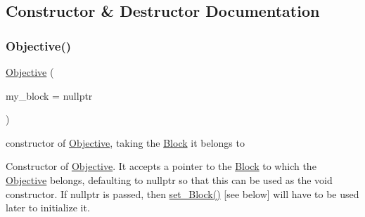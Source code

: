 \subsection{Constructor \& Destructor Documentation}
\mbox{\label{class_s_m_spp__di__unipi__it_1_1_objective_a27af263cb52b39bdee207cff5c4ba18e}} 
\subsubsection{\texorpdfstring{Objective()}{Objective()}\hspace{0.1cm}{\footnotesize\ttfamily [1/2]}}
{\footnotesize\ttfamily \mbox{\hyperlink{class_s_m_spp__di__unipi__it_1_1_objective}{Objective}} (\begin{DoxyParamCaption}\item[{\mbox{\hyperlink{class_s_m_spp__di__unipi__it_1_1_block}{Block}} $\ast$}]{my\+\_\+block = {\ttfamily nullptr} }\end{DoxyParamCaption})\hspace{0.3cm}{\ttfamily [inline]}}



constructor of \mbox{\hyperlink{class_s_m_spp__di__unipi__it_1_1_objective}{Objective}}, taking the \mbox{\hyperlink{class_s_m_spp__di__unipi__it_1_1_block}{Block}} it belongs to 

Constructor of \mbox{\hyperlink{class_s_m_spp__di__unipi__it_1_1_objective}{Objective}}. It accepts a pointer to the \mbox{\hyperlink{class_s_m_spp__di__unipi__it_1_1_block}{Block}} to which the \mbox{\hyperlink{class_s_m_spp__di__unipi__it_1_1_objective}{Objective}} belongs, defaulting to nullptr so that this can be used as the void constructor. If nullptr is passed, then \mbox{\hyperlink{class_s_m_spp__di__unipi__it_1_1_objective_ae25adfb4d0355dc999de19a850b0025d}{set\+\_\+\+Block()}} \mbox{[}see below\mbox{]} will have to be used later to initialize it. \mbox{\label{class_s_m_spp__di__unipi__it_1_1_objective_ae1772e2e5d238495aef316dc74e10b35}} 
